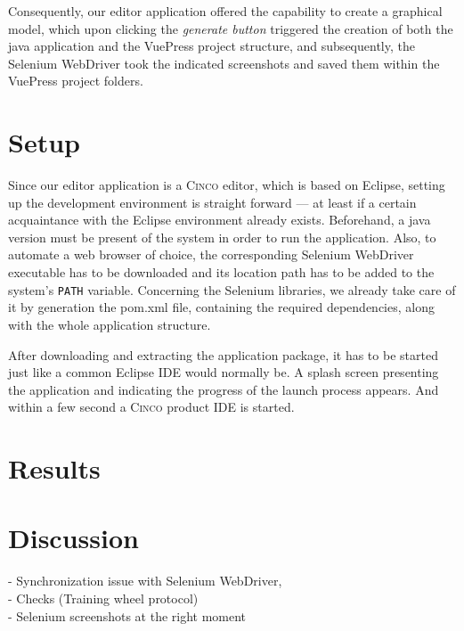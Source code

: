 Consequently, our editor application offered the capability to create a graphical model, which upon clicking the \textit{generate button} triggered the creation of both the java application and the VuePress project structure, and subsequently, the Selenium WebDriver took the indicated screenshots and saved them within the VuePress project folders.

\section{Setup}\label{sec:setup}

Since our editor application is a \textsc{Cinco} editor, which is based on Eclipse, setting up the development environment is straight forward --- at least if a certain acquaintance with the Eclipse environment already exists. Beforehand, a java version must be present of the system in order to run the application. Also, to automate a web browser of choice, the corresponding Selenium WebDriver executable has to be downloaded and its location path has to be added to the system's \lstinline{PATH} variable. Concerning the Selenium libraries, we already take care of it by generation the pom.xml file, containing the required dependencies, along with the whole application structure.

After downloading and extracting the application package, it has to be started just like a common Eclipse IDE would normally be. A splash screen presenting the application and indicating the progress of the launch process appears. And within a few second a \textsc{Cinco} product IDE is started. 

\section{Results}\label{sec:res}

\section{Discussion}\label{sec:disc}

- Synchronization issue with Selenium WebDriver,\\
- Checks (Training wheel protocol)\\
- Selenium screenshots at the right moment
